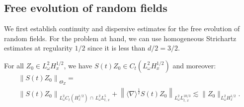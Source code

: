 \documentclass[AHL, Unicode, longabstracts,published]{cedram}
\begin{document}
\subsection{Free evolution of random fields}

We first establish continuity and dispersive estimates for the free evolution of random fields. For the problem at hand, we can use homogeneous Strichartz estimates at regularity $1/2$ since it is less than $d/2=3/2$.

\begin{lemm}\label{lem:strichartzrandom}
For all $Z_0 \in L^2_\omega H^{1/2}_x$, we have $S(t)Z_0\in C_t(L^2_\omega H^{1/2}_x)$ and moreover:
\begin{multline} \label{bd:strichartzrandom}
\left\| S(t)Z_0\right\|_{\Theta_Z}=\\
\left\|S(t)Z_0\right\|_{L^2_\omega C_t\left(H^{1/2}_x\right)\,\cap \,L^2_\omega L^5_{t,\,x}}+\left\| \langle \nabla \rangle^{\frac 12}S(t)Z_0\right\|_{L^2_\omega L^{10/3}_{t,\,x}} \lesssim \|Z_0\|_{L^2_\omega H^{1/2}_x}.
\end{multline}
\end{lemm}
\end{document}
